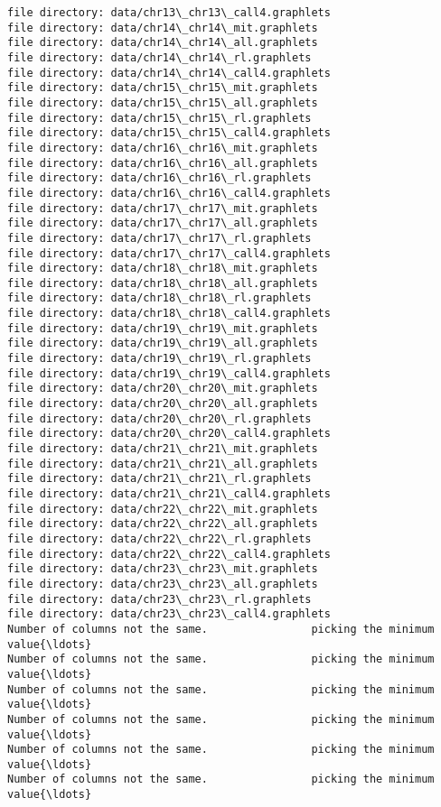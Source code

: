 \documentclass[11pt]{article}
\begin{document}
\begin{Verbatim}[commandchars=\\\{\}]
file directory: data/chr13\_chr13\_call4.graphlets
file directory: data/chr14\_chr14\_mit.graphlets
file directory: data/chr14\_chr14\_all.graphlets
file directory: data/chr14\_chr14\_rl.graphlets
file directory: data/chr14\_chr14\_call4.graphlets
file directory: data/chr15\_chr15\_mit.graphlets
file directory: data/chr15\_chr15\_all.graphlets
file directory: data/chr15\_chr15\_rl.graphlets
file directory: data/chr15\_chr15\_call4.graphlets
file directory: data/chr16\_chr16\_mit.graphlets
file directory: data/chr16\_chr16\_all.graphlets
file directory: data/chr16\_chr16\_rl.graphlets
file directory: data/chr16\_chr16\_call4.graphlets
file directory: data/chr17\_chr17\_mit.graphlets
file directory: data/chr17\_chr17\_all.graphlets
file directory: data/chr17\_chr17\_rl.graphlets
file directory: data/chr17\_chr17\_call4.graphlets
file directory: data/chr18\_chr18\_mit.graphlets
file directory: data/chr18\_chr18\_all.graphlets
file directory: data/chr18\_chr18\_rl.graphlets
file directory: data/chr18\_chr18\_call4.graphlets
file directory: data/chr19\_chr19\_mit.graphlets
file directory: data/chr19\_chr19\_all.graphlets
file directory: data/chr19\_chr19\_rl.graphlets
file directory: data/chr19\_chr19\_call4.graphlets
file directory: data/chr20\_chr20\_mit.graphlets
file directory: data/chr20\_chr20\_all.graphlets
file directory: data/chr20\_chr20\_rl.graphlets
file directory: data/chr20\_chr20\_call4.graphlets
file directory: data/chr21\_chr21\_mit.graphlets
file directory: data/chr21\_chr21\_all.graphlets
file directory: data/chr21\_chr21\_rl.graphlets
file directory: data/chr21\_chr21\_call4.graphlets
file directory: data/chr22\_chr22\_mit.graphlets
file directory: data/chr22\_chr22\_all.graphlets
file directory: data/chr22\_chr22\_rl.graphlets
file directory: data/chr22\_chr22\_call4.graphlets
file directory: data/chr23\_chr23\_mit.graphlets
file directory: data/chr23\_chr23\_all.graphlets
file directory: data/chr23\_chr23\_rl.graphlets
file directory: data/chr23\_chr23\_call4.graphlets
Number of columns not the same.                picking the minimum value{\ldots}
Number of columns not the same.                picking the minimum value{\ldots}
Number of columns not the same.                picking the minimum value{\ldots}
Number of columns not the same.                picking the minimum value{\ldots}
Number of columns not the same.                picking the minimum value{\ldots}
Number of columns not the same.                picking the minimum value{\ldots}

    \end{Verbatim}
\end{document}

